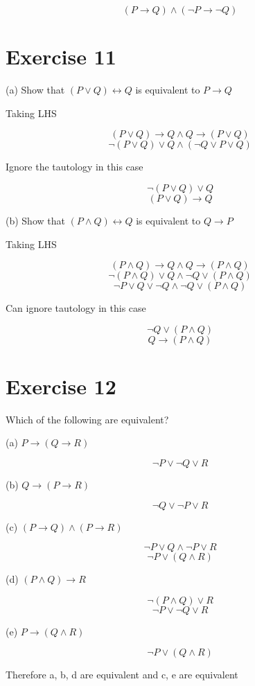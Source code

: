 \documentclass[11pt]{article}
\newcommand{\then}{\rightarrow}
\newcommand{\bicond}{\leftrightarrow}
\begin{document}
$$(P \then Q) \wedge (\neg P \then \neg Q)$$

\section*{Exercise 11}

\noindent (a) Show that $(P \vee Q) \bicond Q$ is equivalent to $P \then Q$

Taking LHS

$$(P \vee Q) \then Q \wedge Q \then (P \vee Q)$$
$$\neg (P \vee Q) \vee Q \wedge (\neg Q \vee P \vee Q)$$

Ignore the tautology in this case

$$\neg (P \vee Q) \vee Q$$
$$(P \vee Q) \then Q$$

\noindent (b) Show that $(P \wedge Q) \bicond Q$ is equivalent to $Q \then P$

Taking LHS

$$(P \wedge Q) \then Q \wedge Q \then (P \wedge Q)$$
$$\neg (P \wedge Q) \vee Q \wedge \neg Q \vee (P \wedge Q)$$
$$\neg P \vee Q \vee \neg Q \wedge \neg Q \vee (P \wedge Q)$$

Can ignore tautology in this case

$$\neg Q \vee (P \wedge Q)$$
$$Q \then (P \wedge Q)$$

\section*{Exercise 12}

\noindent Which of the following are equivalent?

\noindent (a) $P \then (Q \then R)$

$$\neg P \vee \neg Q \vee R$$

\noindent (b) $Q \then (P \then R)$

$$\neg Q \vee \neg P \vee R$$

\noindent (c) $(P \then Q) \wedge (P \then R)$

$$\neg P \vee Q \wedge \neg P \vee R$$
$$\neg P \vee (Q \wedge R)$$

\noindent (d) $(P \wedge Q) \then R$

$$\neg (P \wedge Q) \vee R$$
$$\neg P \vee \neg Q \vee R$$

\noindent (e) $P \then (Q \wedge R)$

$$\neg P \vee (Q \wedge R)$$

Therefore a, b, d are equivalent and c, e are equivalent
\end{document}
